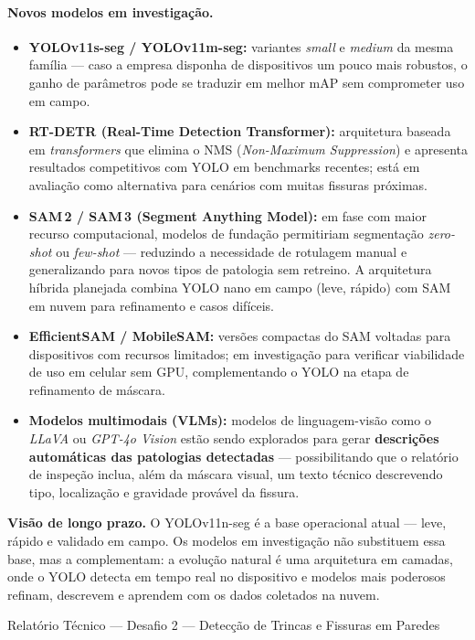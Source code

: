 \documentclass[11pt,a4paper]{article}
\begin{document}
\paragraph{Novos modelos em investigação.}
\begin{itemize}[leftmargin=1.4em]
  \item \textbf{YOLOv11s-seg / YOLOv11m-seg:} variantes \emph{small} e \emph{medium} da
        mesma família — caso a empresa disponha de dispositivos um pouco mais robustos, o ganho
        de parâmetros pode se traduzir em melhor mAP sem comprometer uso em campo.
  \item \textbf{RT-DETR (Real-Time Detection Transformer):} arquitetura baseada em
        \emph{transformers} que elimina o NMS (\emph{Non-Maximum Suppression}) e apresenta
        resultados competitivos com YOLO em benchmarks recentes; está em avaliação como
        alternativa para cenários com muitas fissuras próximas.
  \item \textbf{SAM\,2 / SAM\,3 (Segment Anything Model):} em fase com maior recurso
        computacional, modelos de fundação permitiriam segmentação \emph{zero-shot} ou
        \emph{few-shot} — reduzindo a necessidade de rotulagem manual e generalizando para
        novos tipos de patologia sem retreino. A arquitetura híbrida planejada combina YOLO
        nano em campo (leve, rápido) com SAM em nuvem para refinamento e casos difíceis.
  \item \textbf{EfficientSAM / MobileSAM:} versões compactas do SAM voltadas para dispositivos
        com recursos limitados; em investigação para verificar viabilidade de uso em celular
        sem GPU, complementando o YOLO na etapa de refinamento de máscara.
  \item \textbf{Modelos multimodais (VLMs):} modelos de linguagem-visão como o
        \emph{LLaVA} ou \emph{GPT-4o Vision} estão sendo explorados para gerar
        \textbf{descrições automáticas das patologias detectadas} — possibilitando que o
        relatório de inspeção inclua, além da máscara visual, um texto técnico descrevendo
        tipo, localização e gravidade provável da fissura.
\end{itemize}

\begin{notebox}
\textbf{Visão de longo prazo.} O YOLOv11n-seg é a base operacional atual — leve, rápido e
validado em campo. Os modelos em investigação não substituem essa base, mas a complementam:
a evolução natural é uma arquitetura em camadas, onde o YOLO detecta em tempo real no
dispositivo e modelos mais poderosos refinam, descrevem e aprendem com os dados coletados
na nuvem.
\end{notebox}

\vfill
\begin{center}\small\color{graytxt}
Relatório Técnico — Desafio 2 — Detecção de Trincas e Fissuras em Paredes
\end{center}
\end{document}
